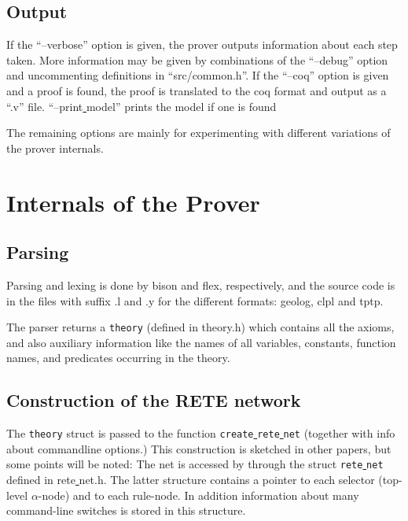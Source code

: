 \documentclass[a4paper]{article}
\begin{document}
\subsection{Output}
If the ``--verbose'' option is given, the prover outputs information about each step taken. More information may be given by combinations of the ``--debug'' option and uncommenting definitions in ``src/common.h''. 
If the ``--coq'' option is given and a proof is found, the proof is translated to the coq format and output as a ``.v'' file. ``--print\underline{ }model'' prints the model if one is found

The remaining options are mainly for experimenting with different variations of the prover internals. 
\section{Internals of the Prover}

\subsection{Parsing}
Parsing and lexing is done by bison and flex, respectively, and the source code is in the files with suffix .l and .y for the different formats: geolog, clpl and tptp. 

The parser returns a \verb|theory| (defined in theory.h) which contains all the axioms, and also auxiliary information like the names of all variables, constants, function names, and predicates occurring in the theory. 

\subsection{Construction of the RETE network}
The \verb|theory| struct is passed to the function \verb|create|\underline{ }\verb|rete|\underline{ }\verb|net| (together with info about commandline options.) This construction is sketched in other papers, but some points will be noted: The net is accessed by through the struct \verb|rete|\underline{ }\verb|net| defined in rete\underline{ }net.h. The latter structure contains a pointer to each selector (top-level $\alpha$-node) and to each rule-node. In addition information about many command-line switches is stored in this structure. 
\end{document}

